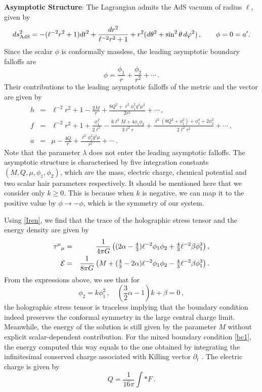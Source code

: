 \documentclass[11pt]{article}
\newcommand{\be}{\begin{equation}}
\newcommand{\ee}{\end{equation}}
\newcommand{\bea}{\setlength\arraycolsep{2pt} \begin{eqnarray}}
\newcommand{\eea}{\end{eqnarray}}
\newcommand{\nn}{\nonumber}
\def\ft#1#2{{\textstyle{\frac{\scriptstyle #1}{\scriptstyle #2} } }}
\def\fft#1#2{{\frac{#1}{#2}}}
\begin{document}
{\bf Asymptotic Structure}: The Lagrangian admits the AdS vacuum of radius $\ell$, given by
\be
ds_{\rm AdS}^2 = -(\ell^{-2} r^2 + 1) dt^2 + \fft{dr^2}{\ell^{-2} r^2 + 1} + r^2 (d\theta^2 + \sin^2\theta\, d\varphi^2)\,,\qquad \phi=0=a'.\label{adsvac}
\ee
Since the scalar $\phi$ is conformally massless, the leading asymptotic boundary falloffs are
\be
\phi=\fft{\phi_1}{r} + \fft{\phi_2}{r^2} + \cdots\,.\label{scalarhair}
\ee
Their contributions to the leading asymptotic falloffs of the metric and the vector are given by
\bea
h &=&  \ell^{-2} r^2 + 1 - \fft{2M}{r} + \fft{8Q^2 + \ell^2 \phi_1^2 q^2 \mu^2}{2r^2} + \cdots\,,\nn\\
f &= & \ell^{-2} r^2 + 1 + \fft{\phi_1^2}{2\ell^{2}}- \fft{6\ell^2 M + 4 \phi_1\phi_2}{3\ell^2 r}
+ \fft{\ell^2(8Q^2 + \phi_1^2) + \phi_1^4 + 2 \phi_2^2}{2\ell^2 r^2} + \cdots\,,\nn\\
a &=&  \mu - \fft{4Q}{r} + \fft{\ell^2\phi_1^2 q^2\mu}{r^2} + \cdots \,.\label{falloffs}
\eea
Note that the parameter $\lambda$ does not enter the leading asymptotic falloffs. The asymptotic structure is characterised by five integration constants $(M,Q, \mu, \phi_1,\phi_2)$, which are the mass, electric charge, chemical potential and two scalar hair parameters respectively. It should be mentioned here that we consider only $k\ge 0$.  This is because when $k$ is negative, we can map it to the positive value by $\phi\rightarrow -\phi$, which is the symmetry of our system.

Using \eqref{Iren}, we find that the trace of the holographic stress tensor and the energy density are given by \cite{Cremonini:2014gia}
\bea
\tau^\mu{}_\mu &=&\frac1{4\pi G}\left((2\alpha-\ft43) {\ell}^{-2} \phi_1\phi_2 +\ft43 {\ell}^{-2} \beta
\phi_1^3\right),\nn\\
{\cal E} &=& \frac1{8\pi G}\left(M + (\ft43-2\alpha) {\ell}^{-2} \phi_1\phi_2 - \ft43 {\ell}^{-2}\beta
\phi_1^3\right).
\eea
From the expressions above, we see that for
\be
\phi_2=k\phi_1^2\,,\quad (\ft{3}2 \alpha-1)k+\beta=0\,,
\ee
the holographic stress tensor is traceless implying that the boundary condition indeed preserves the conformal symmetry in the large central charge limit. Meanwhile, the energy of the solution is still given by the parameter $M$ without explicit scalar-dependent contribution. For the mixed boundary condition \eqref{bc1}, the energy computed this way equals to the one obtained by integrating the infinitesimal conserved charge associated with Killing vector $\partial_t$ \cite{Lu:2013ura}. The electric charge is given by
\be
Q=\frac1{16\pi}\int *F\,.
\ee
\end{document}
